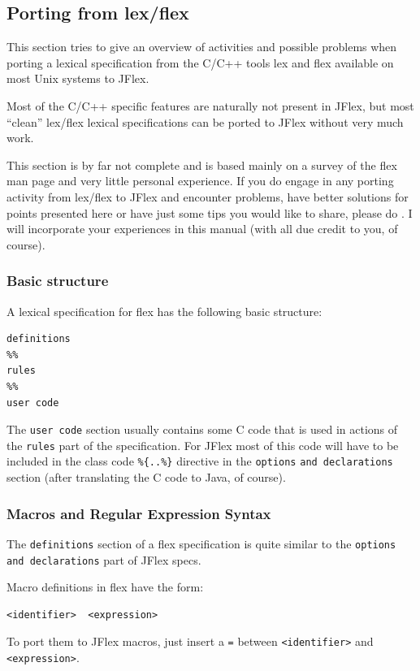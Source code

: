 \documentclass[11pt]{scrartcl}
\begin{document}
\subsection{Porting from lex/flex\label{lexport}}
This section tries to give an overview of activities and possible
problems when porting a lexical specification from the C/C++ tools lex
and flex \cite{flex} available on most Unix systems to JFlex.

Most of the C/C++ specific features are naturally not present in JFlex,
but most ``clean'' lex/flex lexical specifications can be ported to 
JFlex without very much work.

This section is by far not complete and is based mainly on a survey of
the flex man page and very little personal experience.  If you do
engage in any porting activity from lex/flex to JFlex and encounter
problems, have better solutions for points presented here or have just
some tips you would like to share, please do 
%
. I will
incorporate your experiences in this manual (with all due credit to you,
of course).

\subsubsection{Basic structure}
A lexical specification for flex has the following basic structure:
\begin{verbatim}
definitions
%%
rules
%%
user code
\end{verbatim}

The \texttt{user code} section usually contains some C code that is used
in actions of the \texttt{rules} part of the specification. For JFlex most
of this code will have to be included in the class code \verb+%{..%}+
directive in the \texttt{options} \texttt{and dec\-la\-ra\-ti\-ons} section (after 
translating the C code to Java, of course). 

\subsubsection{Macros and Regular Expression Syntax}
The \texttt{definitions} section of a flex specification is quite similar
to the \texttt{op\-tions and dec\-la\-ra\-tions} part of JFlex specs.

Macro definitions in flex have the form:
\begin{verbatim}
<identifier>  <expression>
\end{verbatim}
To port them to JFlex macros, just insert a \texttt{=} between \texttt{<identifier>}
and \texttt{<expression>}.
\end{document}
